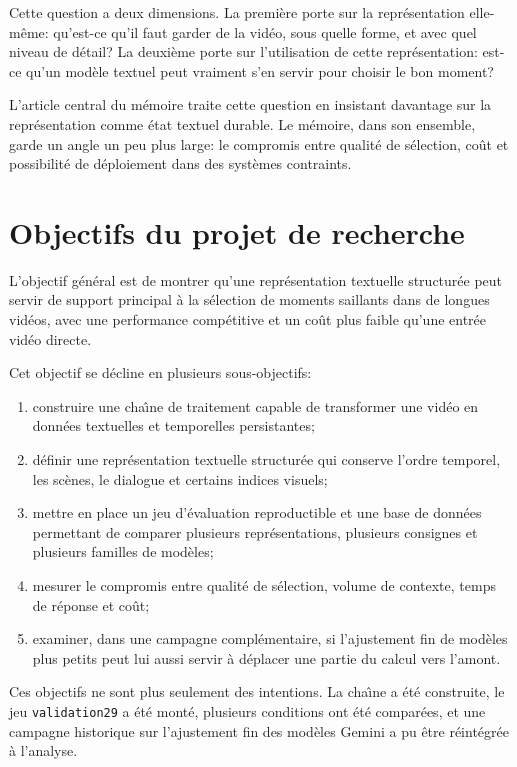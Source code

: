 Cette question a deux dimensions. La premi\`ere porte sur la repr\'esentation elle-m\^eme: qu'est-ce qu'il faut garder de la vid\'eo, sous quelle forme, et avec quel niveau de d\'etail? La deuxi\`eme porte sur l'utilisation de cette repr\'esentation: est-ce qu'un mod\`ele textuel peut vraiment s'en servir pour choisir le bon moment?

L'article central du m\'emoire traite cette question en insistant davantage sur la repr\'esentation comme \'etat textuel durable. Le m\'emoire, dans son ensemble, garde un angle un peu plus large: le compromis entre qualit\'e de s\'election, co\^ut et possibilit\'e de d\'eploiement dans des syst\`emes contraints.

\section{Objectifs du projet de recherche}

L'objectif g\'en\'eral est de montrer qu'une repr\'esentation textuelle structur\'ee peut servir de support principal \`a la s\'election de moments saillants dans de longues vid\'eos, avec une performance comp\'etitive et un co\^ut plus faible qu'une entr\'ee vid\'eo directe.

Cet objectif se d\'ecline en plusieurs sous-objectifs:

\begin{enumerate}
  \item construire une cha\^\i ne de traitement capable de transformer une vid\'eo en donn\'ees textuelles et temporelles persistantes;
  \item d\'efinir une repr\'esentation textuelle structur\'ee qui conserve l'ordre temporel, les sc\`enes, le dialogue et certains indices visuels;
  \item mettre en place un jeu d'\'evaluation reproductible et une base de donn\'ees permettant de comparer plusieurs repr\'esentations, plusieurs consignes et plusieurs familles de mod\`eles;
  \item mesurer le compromis entre qualit\'e de s\'election, volume de contexte, temps de r\'eponse et co\^ut;
  \item examiner, dans une campagne compl\'ementaire, si l'ajustement fin de mod\`eles plus petits peut lui aussi servir \`a d\'eplacer une partie du calcul vers l'amont.
\end{enumerate}

Ces objectifs ne sont plus seulement des intentions. La cha\^\i ne a \'et\'e construite, le jeu \texttt{validation29} a \'et\'e mont\'e, plusieurs conditions ont \'et\'e compar\'ees, et une campagne historique sur l'ajustement fin des mod\`eles Gemini a pu \^etre r\'eint\'egr\'ee \`a l'analyse.

